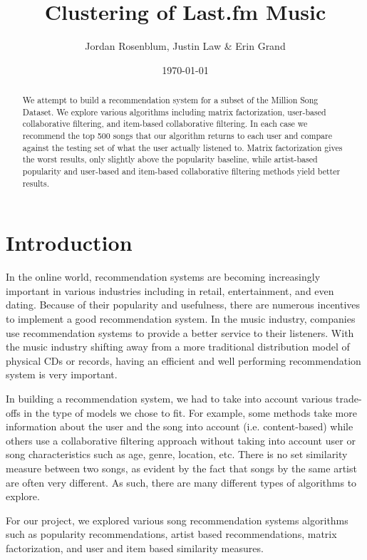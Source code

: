 \documentclass[12pt,preprint]{aastex}
\begin{document}
\title{Clustering of Last.fm Music}

 \author{Jordan Rosenblum, Justin Law \& Erin Grand}
 
\date{\today}             

\begin{abstract}
We attempt to build a recommendation system for a subset of the Million Song Dataset. We explore various algorithms including matrix factorization, user-based collaborative filtering, and item-based collaborative filtering. In each case we recommend the top 500 songs that our algorithm returns to each user and compare against the testing set of what the user actually listened to. Matrix factorization gives the worst results, only slightly above the popularity baseline, while artist-based popularity and user-based and item-based collaborative filtering methods yield better results.
\end{abstract}

\tableofcontents

\section{Introduction}
In the online world, recommendation systems are becoming increasingly important in various industries including in retail, entertainment, and even dating. 
Because of their popularity and usefulness, there are numerous incentives to implement a good recommendation system. 
In the music industry, companies use recommendation systems to provide a better service to their listeners. 
With the music industry shifting away from a more traditional distribution model of physical CDs or records, 
having an efficient and well performing recommendation system is very important. 

In building a recommendation system, we had to take into account various trade-offs in the type of models we chose to fit. For example, some methods take more information about the user and the song into account (i.e. content-based) while others use a collaborative filtering approach without taking into account user or song characteristics such as age, genre, location, etc.
There is no set similarity measure between two songs, as evident by the fact that songs by the same artist are often very different. As such, there are many different types of algorithms to explore. 

For our project, we explored various song recommendation systems algorithms such as popularity recommendations, artist based recommendations, matrix factorization, and user and item based similarity measures.  
\end{document}
